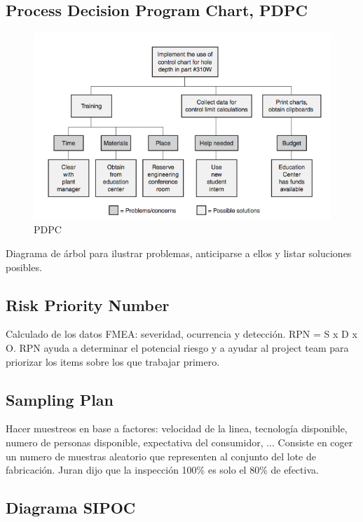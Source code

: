 \documentclass[]{article}
\begin{document}
\subsection{Process Decision Program Chart, PDPC}

\begin{figure}[ht!]
	\centering
	\includegraphics[width=120mm]{imagenes/PDPC.png}
	\caption{PDPC}
	\label{fig:PDPC}
\end{figure}

Diagrama de árbol para ilustrar problemas, anticiparse a ellos y listar soluciones posibles.

\subsection{Risk Priority Number}

Calculado de los datos FMEA: severidad, ocurrencia y detección. RPN = S x D x O. RPN ayuda a determinar el potencial riesgo y a ayudar al project team para priorizar los items sobre los que trabajar primero.

\subsection{Sampling Plan}

Hacer muestreos en base a factores: velocidad de la linea, tecnología disponible, numero de personas disponible, expectativa del consumidor, ... 
Consiste en coger un numero de muestras aleatorio que representen al conjunto del lote de fabricación.
Juran dijo que la inspección 100\% es solo el 80\% de efectiva.

\subsection{Diagrama SIPOC}
\end{document}
